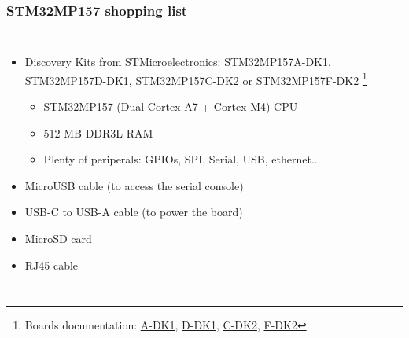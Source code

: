 \newtoggle{stm32mp157-nunchuk}

\newtoggle{stm32mp157-audio}

\begin{frame}
\frametitle{STM32MP157 shopping list}
  \footnotesize
  \begin{columns}
    \begin{itemize}
        \item Discovery Kits from STMicroelectronics: STM32MP157A-DK1, STM32MP157D-DK1, STM32MP157C-DK2 or STM32MP157F-DK2
            \footnote{\tiny Boards documentation:
            \href{https://www.st.com/en/evaluation-tools/stm32mp157a-dk1.html}{A-DK1},
            \href{https://www.st.com/en/evaluation-tools/stm32mp157d-dk1.html}{D-DK1},
            \href{https://www.st.com/en/evaluation-tools/stm32mp157c-dk2.html}{C-DK2},
            \href{https://www.st.com/en/evaluation-tools/stm32mp157f-dk2.html}{F-DK2}
            }
        \begin{itemize}
            \item STM32MP157 (Dual Cortex-A7 + Cortex-M4) CPU
            \item 512 MB DDR3L RAM
            \item Plenty of periperals: GPIOs, SPI, Serial, USB,
                ethernet...
        \end{itemize}
        \item MicroUSB cable (to access the serial console)
        \item USB-C to USB-A cable (to power the board)
        \iftoggle{stm32mp157-nunchuk}{
        \item Nintendo Nunchuk with UEXT connector
            \footnote{\tiny \url{https://www.olimex.com/Products/Modules/Sensors/MOD-WII/MOD-Wii-UEXT-NUNCHUCK/}}
        \item Breadboard jumper wires - Male ends (to connect the Nunchuk)
             \footnote{\tiny \url{https://www.olimex.com/Products/Breadboarding/JUMPER-WIRES/JW-110x10/}}
	}{}
        \item MicroSD card
        \item RJ45 cable

\end{itemize}
\end{columns}
\end{frame}

